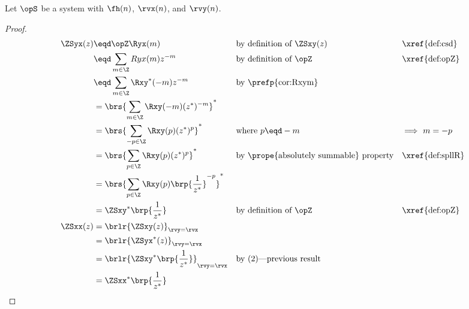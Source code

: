 %
\begin{theorem}
\label{thm:ZSxy_sym}
Let $\opS$ be a system with  $\fh(n)$,
 $\rvx(n)$, and  $\rvy(n)$.
\end{theorem}
\begin{proof}
\begin{align*}
  \ZSyx(z)
     &\eqd \opZ \Ryx(m)
    && \text{by definition of $\ZSxy(z)$}
    && \text{\xref{def:csd}}
  \\&\eqd \sum_{m\in\Z} Ryx(m) z^{-m}
    && \text{by definition of $\opZ$}
    && \text{\xref{def:opZ}}
  \\&\eqd \sum_{m\in\Z} \Rxy^\ast(-m) z^{-m}
    && \text{by \prefp{cor:Rxym}}
  \\&= \brs{\sum_{m\in\Z} \Rxy(-m) (z^\ast)^{-m}}^\ast
  \\&= \brs{\sum_{-p\in\Z} \Rxy(p) (z^\ast)^{p}}^\ast
    && \text{where $p\eqd -m$}
    && \text{$\implies$ $m=-p$}
  \\&= \brs{\sum_{p\in\Z} \Rxy(p) (z^\ast)^{p}}^\ast
    && \text{by \prope{absolutely summable} property}
    && \text{\xref{def:spllR}}
  \\&= \brs{\sum_{p\in\Z} \Rxy(p) \brp{\frac{1}{z^\ast}}^{-p}}^\ast
  \\&= \ZSxy^\ast\brp{\frac{1}{z^\ast}}
    && \text{by definition of $\opZ$}
    && \text{\xref{def:opZ}}
  \\
  \ZSxx(z)
    &= \brlr{\ZSxy(z)}_{\rvy=\rvx}
  \\&= \brlr{\ZSyx^\ast(z)}_{\rvy=\rvx}
  \\&= \brlr{\ZSxy^\ast\brp{\frac{1}{z^\ast}}}_{\rvy=\rvx}
    && \text{by (2)---previous result}
  \\&= \ZSxx^\ast\brp{\frac{1}{z^\ast}}
\end{align*}
\end{proof}

